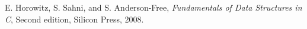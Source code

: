\documentclass{article}
\begin{document}
\newpage
\begin{thebibliography}{100}

 E. Horowitz, S. Sahni, and S. Anderson-Free, \emph{Fundamentals of Data Structures in C}, Second edition, Silicon Press, 2008. 


 \end{thebibliography}            
\end{document}
